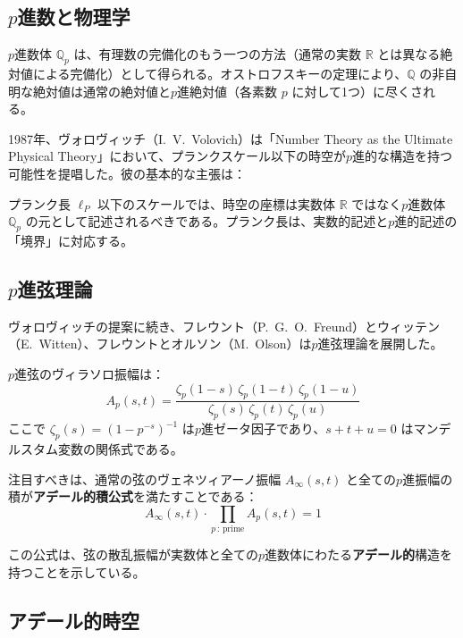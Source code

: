 \documentclass[12pt,a4paper]{ltjsarticle}
\theoremstyle{definition}
\begin{document}
\subsection{$p$進数と物理学}

$p$進数体 $\mathbb{Q}_p$ は、有理数の完備化のもう一つの方法（通常の実数 $\mathbb{R}$ とは異なる絶対値による完備化）として得られる。オストロフスキーの定理により、$\mathbb{Q}$ の非自明な絶対値は通常の絶対値と$p$進絶対値（各素数 $p$ に対して1つ）に尽くされる。

1987年、ヴォロヴィッチ（I.~V.~Volovich）は「Number Theory as the Ultimate Physical Theory」\cite{Volovich1987}において、プランクスケール以下の時空が$p$進的な構造を持つ可能性を提唱した。彼の基本的な主張は：

\begin{keyinsight}
プランク長 $\ell_P$ 以下のスケールでは、時空の座標は実数体 $\mathbb{R}$ ではなく$p$進数体 $\mathbb{Q}_p$ の元として記述されるべきである。プランク長は、実数的記述と$p$進的記述の「境界」に対応する。
\end{keyinsight}

\subsection{$p$進弦理論}

ヴォロヴィッチの提案に続き、フレウント（P.~G.~O.~Freund）とウィッテン（E.~Witten）\cite{FreundWitten1987}、フレウントとオルソン（M.~Olson）\cite{FreundOlson1987}は$p$進弦理論を展開した。

$p$進弦のヴィラソロ振幅は：
\begin{equation}
  A_p(s,t) = \frac{\zeta_p(1-s)\,\zeta_p(1-t)\,\zeta_p(1-u)}{\zeta_p(s)\,\zeta_p(t)\,\zeta_p(u)}
\end{equation}
ここで $\zeta_p(s) = (1 - p^{-s})^{-1}$ は$p$進ゼータ因子であり、$s + t + u = 0$ はマンデルスタム変数の関係式である。

注目すべきは、通常の弦のヴェネツィアーノ振幅 $A_\infty(s,t)$ と全ての$p$進振幅の積が\textbf{アデール的積公式}を満たすことである\cite{FreundWitten1987}：
\begin{equation}
  A_\infty(s,t) \cdot \prod_{p\,:\,\text{prime}} A_p(s,t) = 1
\end{equation}

この公式は、弦の散乱振幅が実数体と全ての$p$進数体にわたる\textbf{アデール的}構造を持つことを示している。

\subsection{アデール的時空}
\end{document}
